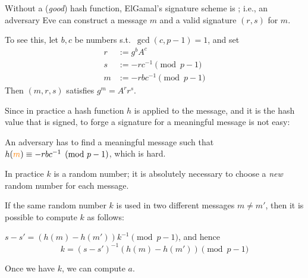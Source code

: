 \begin{frame}


Without a ({\em good}) hash function, ElGamal's signature scheme is
; i.e., an adversary Eve can construct a
message $m$ and a valid signature $(r,s)$ for $m$.

To see this, let $b,c$ be numbers s.t.\
$\gcd(c,p-1)=1$, and set  
\begin{align*}
r &:= g^bA^c \\ 
s &:= -rc^{-1}\pmod{p-1} \\
m &:= -rbc^{-1}\pmod{p-1}
\end{align*}
Then $(m,r,s)$ satisfies $g^m=A^rr^s$.

Since in practice a hash function $h$ is applied to the message, and
it is the hash value that is signed, to forge a signature for a
meaningful message is not easy:  

An adversary has to find a meaningful message  such that
$h(\text{\highlight{$m$}})\equiv -rbc^{-1}\pmod{p-1}$, which is hard.
\end{frame}

\begin{frame}
In practice $k$ is a random number;
it is absolutely necessary to choose a {\em new} random number for
each message.

If the same random number $k$ is used in two
different messages $m\neq m'$, then it is possible to compute $k$
as follows: 

$s-s'=(h(m)-h(m'))k^{-1}\pmod{p-1}$, and hence
$$
k=(s-s')^{-1}(h(m)-h(m'))\pmod{p-1}
$$

Once we have $k$, we can compute $a$.

\end{frame}

